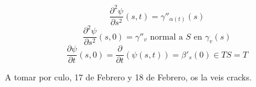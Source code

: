 \documentclass[openany]{book}
\begin{document}
\begin{demonstration}
  $$ \dfrac{\partial ^2 \psi}{\partial s^2}(s,t) = \gamma ''_{\alpha (t)}(s)  $$
  $$ \dfrac{\partial ^2 \psi}{\partial s^2}(s,0) = \gamma ''_v \text{ normal a }S \text{ en } \gamma _v(s) $$
  $$ \dfrac{\partial \psi}{\partial t}(s,0) = \dfrac{\partial }{\partial t}\left( \psi(s,t) \right) = \beta '_s(0) \in TS=T   $$

  A tomar por culo, 17 de Febrero y 18 de Febrero, os la veis cracks.
\end{demonstration}
\end{document}
